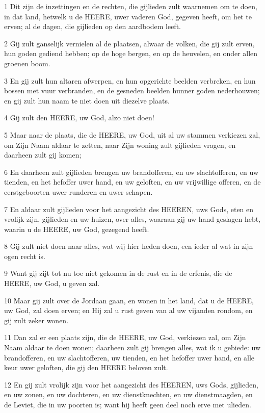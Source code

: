 \par 1 Dit zijn de inzettingen en de rechten, die gijlieden zult waarnemen om te doen, in dat land, hetwelk u de HEERE, uwer vaderen God, gegeven heeft, om het te erven; al de dagen, die gijlieden op den aardbodem leeft.
\par 2 Gij zult ganselijk vernielen al de plaatsen, alwaar de volken, die gij zult erven, hun goden gediend hebben; op de hoge bergen, en op de heuvelen, en onder allen groenen boom.
\par 3 En gij zult hun altaren afwerpen, en hun opgerichte beelden verbreken, en hun bossen met vuur verbranden, en de gesneden beelden hunner goden nederhouwen; en gij zult hun naam te niet doen uit diezelve plaats.
\par 4 Gij zult den HEERE, uw God, alzo niet doen!
\par 5 Maar naar de plaats, die de HEERE, uw God, uit al uw stammen verkiezen zal, om Zijn Naam aldaar te zetten, naar Zijn woning zult gijlieden vragen, en daarheen zult gij komen;
\par 6 En daarheen zult gijlieden brengen uw brandofferen, en uw slachtofferen, en uw tienden, en het hefoffer uwer hand, en uw geloften, en uw vrijwillige offeren, en de eerstgeboorten uwer runderen en uwer schapen.
\par 7 En aldaar zult gijlieden voor het aangezicht des HEEREN, uws Gods, eten en vrolijk zijn, gijlieden en uw huizen, over alles, waaraan gij uw hand geslagen hebt, waarin u de HEERE, uw God, gezegend heeft.
\par 8 Gij zult niet doen naar alles, wat wij hier heden doen, een ieder al wat in zijn ogen recht is.
\par 9 Want gij zijt tot nu toe niet gekomen in de rust en in de erfenis, die de HEERE, uw God, u geven zal.
\par 10 Maar gij zult over de Jordaan gaan, en wonen in het land, dat u de HEERE, uw God, zal doen erven; en Hij zal u rust geven van al uw vijanden rondom, en gij zult zeker wonen.
\par 11 Dan zal er een plaats zijn, die de HEERE, uw God, verkiezen zal, om Zijn Naam aldaar te doen wonen; daarheen zult gij brengen alles, wat ik u gebiede: uw brandofferen, en uw slachtofferen, uw tienden, en het hefoffer uwer hand, en alle keur uwer geloften, die gij den HEERE beloven zult.
\par 12 En gij zult vrolijk zijn voor het aangezicht des HEEREN, uws Gods, gijlieden, en uw zonen, en uw dochteren, en uw dienstknechten, en uw dienstmaagden, en de Leviet, die in uw poorten is; want hij heeft geen deel noch erve met ulieden.
